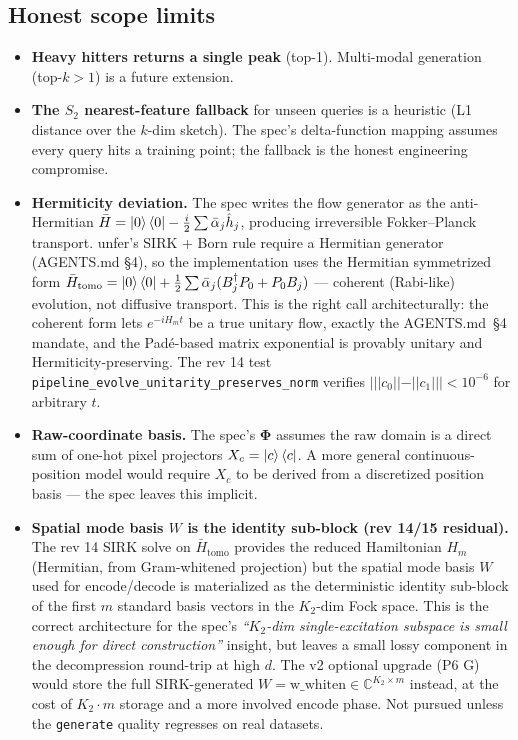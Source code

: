 \documentclass[11pt, a4paper]{article}
\newcommand{\Cset}{\mathbb{C}}
\begin{document}
\subsection{Honest scope limits}

\begin{itemize}
\item \textbf{Heavy hitters returns a single peak} (top-1). Multi-modal
generation (top-$k>1$) is a future extension.
\item \textbf{The $S_2$ nearest-feature fallback} for unseen queries is a
heuristic (L1 distance over the $k$-dim sketch). The spec's delta-function
mapping assumes every query hits a training point; the fallback is the
honest engineering compromise.
\item \textbf{Hermiticity deviation.} The spec writes the flow generator as
the anti-Hermitian $\bar H=\ket{0}\bra{0}-\frac{i}{2}\sum\bar\alpha_j\hat h_j$,
producing irreversible Fokker--Planck transport. unfer's SIRK + Born rule
require a Hermitian generator (AGENTS.md \S4), so the implementation uses
the Hermitian symmetrized form
$\bar H_{\mathrm{tomo}}=\ket{0}\bra{0}+\frac12\sum\bar\alpha_j(B^\dagger_j
P_0+P_0 B_j)$ --- coherent (Rabi-like) evolution, not diffusive transport.
This is the right call architecturally: the coherent form lets
$e^{-iH_m t}$ be a true unitary flow, exactly the AGENTS.md~\S4 mandate,
and the Pad\'e-based matrix exponential is provably unitary and
Hermiticity-preserving. The rev 14 test
\texttt{pipeline\_evolve\_unitarity\_preserves\_norm} verifies
$|||c_0||-||c_1||| < 10^{-6}$ for arbitrary $t$.
\item \textbf{Raw-coordinate basis.} The spec's $\mathbf\Phi$ assumes the
raw domain is a direct sum of one-hot pixel projectors $X_c=\ket{c}\bra{c}$.
A more general continuous-position model would require $X_c$ to be derived
from a discretized position basis --- the spec leaves this implicit.
\item \textbf{Spatial mode basis $W$ is the identity sub-block (rev 14/15
residual).} The rev 14 SIRK solve on $\bar H_{\mathrm{tomo}}$ provides
the reduced Hamiltonian $H_m$ (Hermitian, from Gram-whitened
projection) but the spatial mode basis $W$ used for encode/decode is
materialized as the deterministic identity sub-block of the first $m$
standard basis vectors in the $K_2$-dim Fock space. This is the correct
architecture for the spec's \emph{``$K_2$-dim single-excitation
subspace is small enough for direct construction''} insight, but leaves
a small lossy component in the decompression round-trip at high $d$.
The v2 optional upgrade (P6 G) would store the full SIRK-generated
$W=\mathrm{w\_whiten}\in\Cset^{K_2\times m}$ instead, at the cost of
$K_2\cdot m$ storage and a more involved encode phase. Not pursued
unless the \texttt{generate} quality regresses on real datasets.
\end{itemize}
\end{document}
